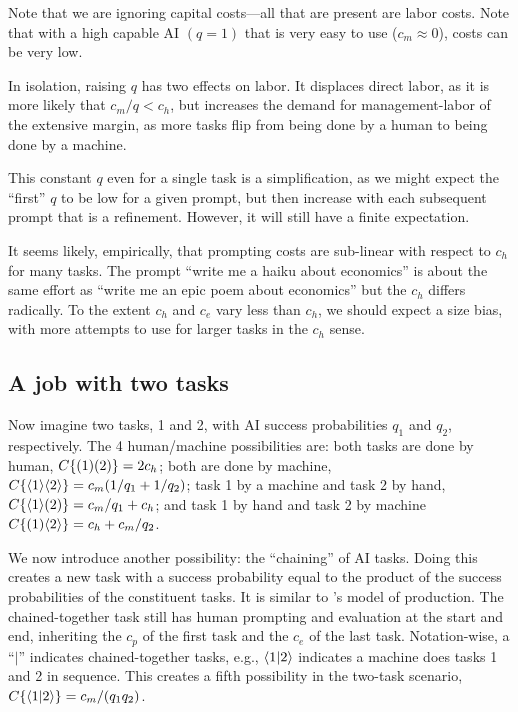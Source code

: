\documentclass{article}
\begin{document}
Note that we are ignoring capital costs---all that are present are labor costs.
Note that with a high capable AI $(q = 1)$ that is very easy to use ($c_m \approx 0$), costs can be very low.

In isolation, raising $q$ has two effects on labor.
It displaces direct labor, as it is more likely that $c_m/q < c_h$, but increases the demand for management-labor of the extensive margin, as more tasks flip from being done by a human to being done by a machine.

This constant $q$ even for a single task is a simplification, as we might expect the ``first'' $q$ to be low for a given prompt, but then increase with each subsequent prompt that is a refinement.
However, it will still have a finite expectation.

It seems likely, empirically, that prompting costs are sub-linear with respect to $c_h$ for many tasks.
The prompt ``write me a haiku about economics'' is about the same effort as ``write me an epic poem about economics'' but the $c_h$ differs radically. 
To the extent $c_h$ and $c_e$ vary less than $c_h$, we should expect a size bias, with more attempts to use for larger tasks in the $c_h$ sense.  

\subsection{A job with two tasks}
Now imagine two tasks, 1 and 2, with AI success probabilities $q_1$ and $q_2$, respectively.
The 4 human/machine possibilities are: both tasks are done by human, $C\{ ( 1 )( 2 ) \} = 2 c_h$;
both are done by machine, $C\{ \langle 1 \rangle\langle 2 \rangle \} = c_m (1/q_1 + 1/q_2)$;
task 1 by a machine and task 2 by hand, $C\{ \langle 1 \rangle( 2 ) \} = c_m/q_1 + c_h$; and task 1 by hand and task 2 by machine $C\{ ( 1 )\langle 2 \rangle \} = c_h + c_m/q_2$.

We now introduce another possibility: the ``chaining'' of AI tasks.
Doing this creates a new task with a success probability equal to the product of the success probabilities of the constituent tasks.
It is similar to \cite{kremer1993}'s model of production.
The chained-together task still has human prompting and evaluation at the start and end, inheriting the $c_p$ of the first task and the $c_e$ of the last task.
Notation-wise, a ``$|$'' indicates chained-together tasks, e.g.,  $\langle 1|2 \rangle$ indicates a machine does tasks 1 and 2 in sequence.
This creates a fifth possibility in the two-task scenario, $C\{ \langle 1|2 \rangle \} = c_m/(q_1q_2)$.
\end{document}
